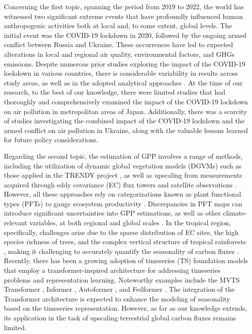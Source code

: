Concerning the first topic, spanning the period from 2019 to 2022, the world has witnessed two significant extreme events that have profoundly influenced human anthropogenic activities both at local and, to some extent, global levels. The initial event was the COVID-19 lockdown in 2020, followed by the ongoing armed conflict between Russia and Ukraine. These occurrences have led to expected alterations in local and regional air quality, environmental factors, and GHGs emissions. Despite numerous prior studies exploring the impact of the COVID-19 lockdown in various countries, there is considerable variability in results across study areas, as well as in the adopted analytical approaches \citep{shi2021abrupt}. At the time of our research, to the best of our knowledge, there were limited studies that had thoroughly and comprehensively examined the impact of the COVID-19 lockdown on air pollution in metropolitan areas of Japan. Additionally, there was a scarcity of studies investigating the combined impact of the COVID-19 lockdown and the armed conflict on air pollution in Ukraine, along with the valuable lessons learned for future policy considerations.\par

Regarding the second topic, the estimation of GPP involves a range of methods, including the utilization of dynamic global vegetation models (DGVMs) such as those applied in the TRENDY project \citep{sitch2015recent, le2018global}, as well as upscaling from measurements acquired through eddy covariance (EC) flux towers and satellite observations \citep{jung2019fluxcom, zeng2020global}. However, all these approaches rely on categorizations known as plant functional types (PFTs) to gauge ecosystem productivity \citep{poulter2011plant, poulter2015plant, lin2021improved, guo2023estimating, yan2023integrating}. Discrepancies in PFT maps can introduce significant uncertainties into GPP estimations, as well as other climate-relevant variables, at both regional and global scales \citep{poulter2011plant}. In the tropical region, specifically, challenges arise due to the sparse distribution of EC sites, the high species richness of trees, and the complex vertical structure of tropical rainforests \citep{montgomery2001forest}, making it challenging to accurately quantify the seasonality of carbon fluxes \citep{xu2015satellite}. Recently, there has been a growing adoption of timeseries (TS) foundation models that employ a transformer-inspired architecture for addressing timeseries problems and representation learning. Noteworthy examples include the MVTS Transformer \citep{zerveas2021transformer}, Informer \citep{zhou2021informer}, Autoformer \citep{wu2021autoformer}, and Fedformer \citep{zhou2022fedformer}. The integration of the Transformer architecture is expected to enhance the modeling of seasonality based on the timeseries representation. However, as far as our knowledge extends, its application in the task of upscaling terrestrial global carbon fluxes remains limited. \par

